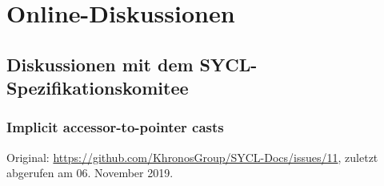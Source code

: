 \chapter{Online-Diskussionen}\label{anhang:diskussionen}

\section{Diskussionen mit dem SYCL-Spezifikationskomitee}
\label{anhang:diskussionen:syclspec}

\subsection{Implicit accessor-to-pointer casts}
\label{anhang:diskussion:syclspec:implicitaccessor}

Original: \url{https://github.com/KhronosGroup/SYCL-Docs/issues/11}, zuletzt
abgerufen am 06. November 2019.

